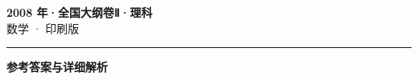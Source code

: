 \documentclass[zihao=5, a4paper]{ctexart}
\begin{document}
\begin{center}
  {\Large\bfseries 2008 年·全国大纲卷Ⅱ·理科}\\[4pt]
  {\large 数学 · 印刷版}
\end{center}
\medskip
{}

\par\bigskip\hrule\bigskip
{}
\begin{center}{\large\bfseries 参考答案与详细解析}\end{center}
\smallskip

\end{document}
